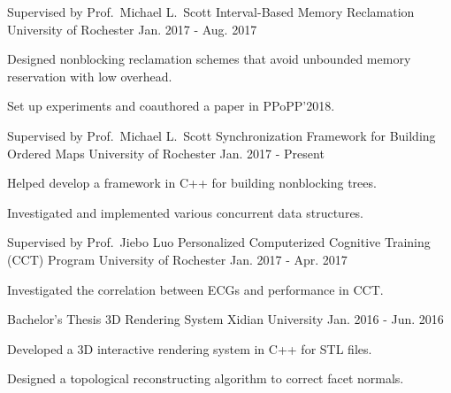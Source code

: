 \begin{cventries}
  \cventry
    {Supervised by Prof.\ Michael L.\ Scott} %
    {Interval-Based Memory Reclamation} %
    {University of Rochester} %
    {Jan. 2017 - Aug. 2017} %
    {
      \begin{cvitems} %
        \item {Designed nonblocking reclamation schemes that avoid unbounded memory reservation with low overhead.}
        \item {Set up experiments and coauthored a paper in PPoPP'2018.}
      \end{cvitems}
    }

  \cventry
    {Supervised by Prof.\ Michael L.\ Scott} %
    {Synchronization Framework for Building Ordered Maps} %
    {University of Rochester} %
    {Jan. 2017 - Present} %
    {
      \begin{cvitems} %
        \item {Helped develop a framework in C++ for building nonblocking trees.}
        \item {Investigated and implemented various concurrent data structures.}
      \end{cvitems}
    }

  \cventry
    {Supervised by Prof.\ Jiebo Luo} %
    {Personalized Computerized Cognitive Training (CCT) Program} %
    {University of Rochester} %
    {Jan. 2017 - Apr. 2017} %
    {
      \begin{cvitems} %
        \item {Investigated the correlation between ECGs and performance in CCT.}
      \end{cvitems}
    }

  \cventry
    {Bachelor's Thesis} %
    {3D Rendering System} %
    {Xidian University} %
    {Jan. 2016 - Jun. 2016} %
    {
      \begin{cvitems} %
        \item {Developed a 3D interactive rendering system in C++ for STL files.}
        \item {Designed a topological reconstructing algorithm to correct facet normals.}
      \end{cvitems}
    }


\end{cventries}
